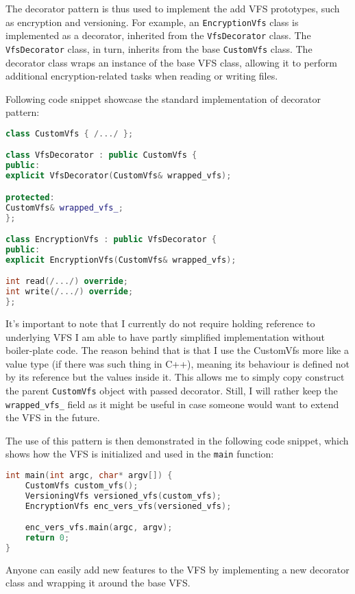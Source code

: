 The decorator pattern is thus used to implement the add VFS prototypes, such as encryption and versioning.
For example, an \texttt{EncryptionVfs} class is implemented as a decorator, inherited from the \texttt{VfsDecorator} class.
The \texttt{VfsDecorator} class, in turn, inherits from the base \texttt{CustomVfs} class.
The decorator class wraps an instance of the base VFS class, allowing it to perform additional encryption-related tasks when reading or writing files.

Following code snippet showcase the standard implementation of decorator pattern:

\begin{lstlisting}[language=c++, basicstyle=\ttfamily\small]
class CustomVfs { /.../ };

class VfsDecorator : public CustomVfs {
public:
explicit VfsDecorator(CustomVfs& wrapped_vfs);

protected:
CustomVfs& wrapped_vfs_;
};

class EncryptionVfs : public VfsDecorator {
public:
explicit EncryptionVfs(CustomVfs& wrapped_vfs);

int read(/.../) override;
int write(/.../) override;
};
\end{lstlisting}

It's important to note that I currently do not require holding reference to underlying VFS I am able to have partly simplified implementation without boiler-plate code.
The reason behind that is that I use the CustomVfs more like a value type (if there was such thing in C++), meaning its behaviour is defined not by its reference but the values inside it.
This allows me to simply copy construct the parent \texttt{CustomVfs} object with passed decorator.
Still, I will rather keep the \texttt{wrapped\_vfs\_} field as it might be useful in case someone would want to extend the VFS in the future.

The use of this pattern is then demonstrated in the following code snippet, which shows how the VFS is initialized and used in the \texttt{main} function:

\begin{lstlisting}[language=c++, basicstyle=\ttfamily\small]
int main(int argc, char* argv[]) {
    CustomVfs custom_vfs();
    VersioningVfs versioned_vfs(custom_vfs);
    EncryptionVfs enc_vers_vfs(versioned_vfs);

    enc_vers_vfs.main(argc, argv);
    return 0;
}
\end{lstlisting}

Anyone can easily add new features to the VFS by implementing a new decorator class and wrapping it around the base VFS\@.

